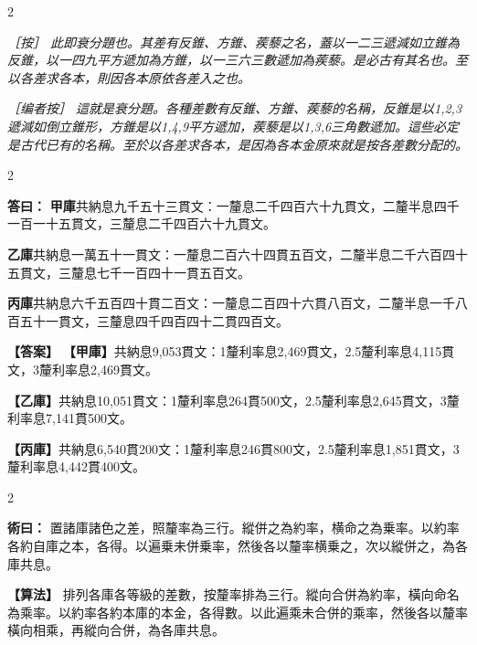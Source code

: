 \documentclass[11pt,a4paper]{article}
\newcommand{\ClassicalAnswer}[1]{\par\noindent\textbf{\color{answercolor}答曰：}#1\par}
\newcommand{\ClassicalMethod}[1]{\par\noindent\textbf{\color{methodcolor}術曰：}#1\par}
\newcommand{\ClassicalNote}[1]{\par\noindent\textit{［按］#1}\par}
\newcommand{\ModernAnswer}[1]{\par\noindent\textbf{\color{answercolor}【答案】}#1\par}
\newcommand{\ModernMethod}[1]{\par\noindent\textbf{\color{methodcolor}【算法】}#1\par}
\newcommand{\ModernNote}[1]{\par\noindent\textit{\color{notecolor}［编者按］#1}\par}
\begin{document}
\begin{paracol}{2}

\ClassicalNote{%
此即衰分題也。其差有反錐、方錐、蒺藜之名，蓋以一二三遞減如立錐為反錐，以一四九平方遞加為方錐，以一三六三數遞加為蒺藜。是必古有其名也。至以各差求各本，則因各本原依各差入之也。}

\switchcolumn

\ModernNote{%
這就是衰分題。各種差數有反錐、方錐、蒺藜的名稱，反錐是以1,2,3遞減如倒立錐形，方錐是以1,4,9平方遞加，蒺藜是以1,3,6三角數遞加。這些必定是古代已有的名稱。至於以各差求各本，是因為各本金原來就是按各差數分配的。
}

\end{paracol}

\begin{paracol}{2}

\ClassicalAnswer{%
\textbf{甲庫}共納息九千五十三貫文：一釐息二千四百六十九貫文，二釐半息四千一百一十五貫文，三釐息二千四百六十九貫文。

\textbf{乙庫}共納息一萬五十一貫文：一釐息二百六十四貫五百文，二釐半息二千六百四十五貫文，三釐息七千一百四十一貫五百文。

\textbf{丙庫}共納息六千五百四十貫二百文：一釐息二百四十六貫八百文，二釐半息一千八百五十一貫文，三釐息四千四百四十二貫四百文。}

\switchcolumn

\ModernAnswer{%
\textbf{【甲庫】}共納息9,053貫文：1釐利率息2,469貫文，2.5釐利率息4,115貫文，3釐利率息2,469貫文。

\textbf{【乙庫】}共納息10,051貫文：1釐利率息264貫500文，2.5釐利率息2,645貫文，3釐利率息7,141貫500文。

\textbf{【丙庫】}共納息6,540貫200文：1釐利率息246貫800文，2.5釐利率息1,851貫文，3釐利率息4,442貫400文。
}

\end{paracol}

\begin{paracol}{2}

\ClassicalMethod{%
置諸庫諸色之差，照釐率為三行。縱併之為約率，横命之為乗率。以約率各約自庫之本，各得。以遍乗未併乗率，然後各以釐率横乗之，次以縱併之，為各庫共息。}

\switchcolumn

\ModernMethod{%
排列各庫各等級的差數，按釐率排為三行。縱向合併為約率，橫向命名為乘率。以約率各約本庫的本金，各得數。以此遍乘未合併的乘率，然後各以釐率橫向相乘，再縱向合併，為各庫共息。
}

\end{paracol}
\end{document}

